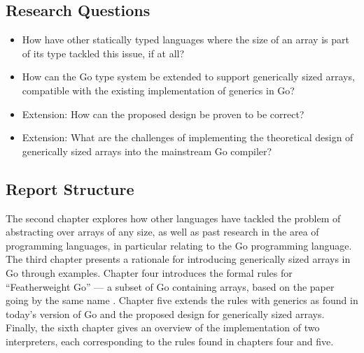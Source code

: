 \subsection{Research Questions}

\begin{itemize}
      \item How have other statically typed languages where the size of an array
            is part of its type tackled this issue, if at all?
      \item How can the Go type system be extended to support generically sized
            arrays, compatible with the existing implementation of generics in
            Go?
      \item Extension: How can the proposed design be proven to be correct?
      \item Extension: What are the challenges of implementing the theoretical
            design of generically sized arrays into the mainstream Go compiler?
\end{itemize}


\subsection{Report Structure}

The second chapter explores how other languages have tackled the problem of
abstracting over arrays of any size, as well as past research in the area of
programming languages, in particular relating to the Go programming language.
The third chapter presents a rationale for introducing generically sized arrays
in Go through examples. Chapter four introduces the formal rules for
``Featherweight Go'' --- a subset of Go containing arrays, based on the paper
going by the same name \autocite{fg}. Chapter five extends the rules with
generics as found in today's version of Go and the proposed design for
generically sized arrays. Finally, the sixth chapter gives an overview of the
implementation of two interpreters, each corresponding to the rules found in
chapters four and five.
